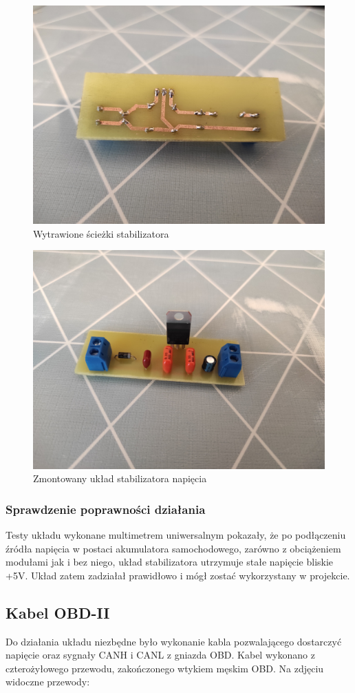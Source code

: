 \documentclass[10pt,a4paper]{scrartcl}
\begin{document}
		\begin{figure}
			\centering
			\includegraphics[width=0.7\linewidth]{wytrawione_ścieżki}
			\caption[Wytrawione ścieżki stabilizatora]{Wytrawione ścieżki stabilizatora}
			\label{fig:wytrawionesciezki}
		\end{figure}
		
		\begin{figure}
			\centering
			\includegraphics[width=0.7\linewidth]{pcb_gotowe}
			\caption[Zmontowany układ]{Zmontowany układ stabilizatora napięcia}
			\label{fig:pcbgotowe}
		\end{figure}
				\subsubsection{Sprawdzenie poprawności działania}
				Testy układu wykonane multimetrem uniwersalnym pokazały, że po podłączeniu źródła napięcia w postaci akumulatora samochodowego, zarówno z obciążeniem modułami jak i bez niego, układ stabilizatora utrzymuje stałe napięcie bliskie +5V. Układ zatem zadziałał prawidłowo i mógł zostać wykorzystany w projekcie.
		\subsection{Kabel OBD-II}
		Do działania układu niezbędne było wykonanie kabla pozwalającego dostarczyć napięcie oraz sygnały CANH i CANL z gniazda OBD. Kabel wykonano z czterożyłowego przewodu, zakończonego wtykiem męskim OBD. Na zdjęciu widoczne przewody: 
			
\end{document}
